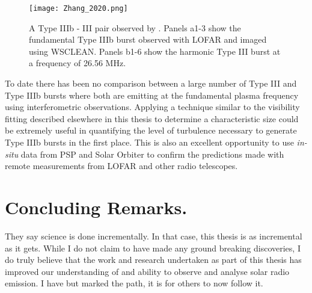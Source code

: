 \begin{figure}
\centering
\texttt{[image: Zhang\_2020.png]}
\caption[Type IIIb - III pair observed by \cite{Zhang2020}]{A Type IIIb - III pair observed by \cite{Zhang2020}. Panels a1-3 show the fundamental Type IIIb burst observed with LOFAR and imaged using WSCLEAN. Panels b1-6 show the harmonic Type III burst at a frequency of 26.56 MHz.  }
\label{fig:typeIIIbIII}
\end{figure}

To date there has been no comparison between a large number of Type III and Type IIIb bursts where both are emitting at the fundamental plasma frequency using interferometric observations. Applying a technique similar to the visibility fitting described elsewhere in this thesis to determine a characteristic size could be extremely useful in quantifying the level of turbulence necessary to generate Type IIIb bursts in the first place. This is also an excellent opportunity to use \textit{in-situ} data from PSP and Solar Orbiter to confirm the predictions made with remote measurements from LOFAR and other radio telescopes. 

\section{Concluding Remarks.}
They say science is done incrementally. In that case, this thesis is as incremental as it gets. While I do not claim to have made any ground breaking discoveries, I do truly believe that the work and research undertaken as part of this thesis has improved our understanding of and ability to observe and analyse solar radio emission.  I have but marked the path, it is for others to now follow it.